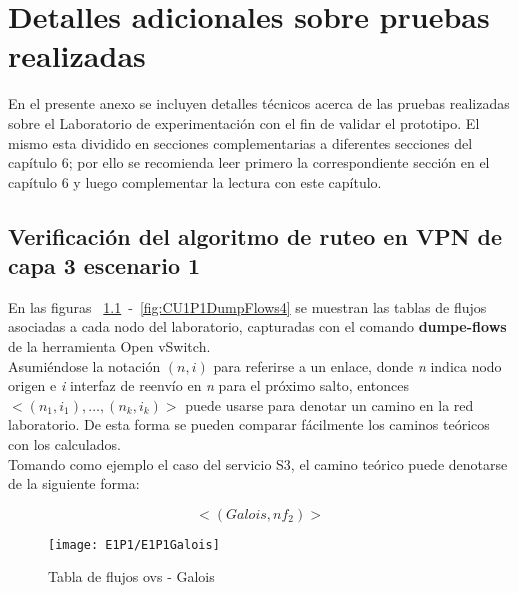 
\chapter{Detalles adicionales sobre pruebas realizadas}
\label{appendix6}

\ifpdf
    \graphicspath{{Appendix6/Figs/Raster/}{Appendix6/Figs/PDF/}{Appendix6/Figs/}}
\else
    \graphicspath{{Appendix6/Figs/Vector/}{Appendix6/Figs/}}
\fi

En el presente anexo se incluyen detalles t\'ecnicos acerca de las pruebas realizadas sobre el Laboratorio de experimentaci\'on con el fin de validar el prototipo. El mismo esta dividido en secciones complementarias a diferentes secciones del cap\'itulo 6; por ello se recomienda leer primero la correspondiente secci\'on en el cap\'itulo 6 y luego complementar la lectura con este cap\'itulo.

\section{Verificación del algoritmo de ruteo en VPN de capa 3 escenario 1}
\label{appendix6.1}
En las figuras ~\ref{fig:CU1P1DumpFlows1}~-~\ref{fig:CU1P1DumpFlows4} se muestran las tablas de flujos asociadas a cada nodo del laboratorio, capturadas con el comando \textbf{dumpe-flows} de la herramienta Open vSwitch.\\

Asumiéndose la notaci\'on $(n, i)$ para referirse a un enlace, donde \textit{n} indica nodo origen e \textit{i} interfaz de reenvío en \textit{n} para el próximo salto, entonces $<(n_1, i_1), \dots, (n_k, i_k)>$ puede usarse para denotar un camino en la red laboratorio. De esta forma se pueden comparar f\'acilmente los caminos te\'oricos con los calculados.\\

Tomando como ejemplo el caso del servicio S3, el camino te\'orico puede denotarse de la siguiente forma:
 
$$<(Galois, nf_2)>$$

\newpage
\begin{figure}[ht!] 
\centering    
\texttt{[image: E1P1/E1P1Galois]}
\caption[Tabla de flujos ovs - Galois]{Tabla de flujos ovs - Galois}
\label{fig:CU1P1DumpFlows1}
\end{figure}

